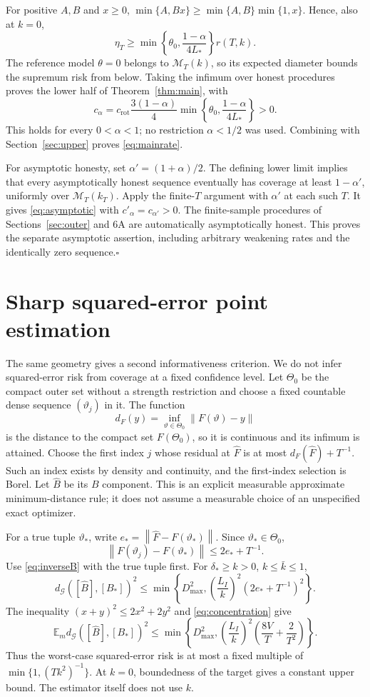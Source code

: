 \documentclass[11pt,a4paper]{article}
\numberwithin{equation}{section}
\newcommand{\E}{\mathbb E}
\newcommand{\cM}{\mathcal M}
\newcommand{\cG}{\mathcal G}
\newcommand{\norm}[1]{\left\lVert #1\right\rVert}
\begin{document}
For positive \(A,B\) and \(x\ge0\),
\(\min\{A,Bx\}\ge\min\{A,B\}\min\{1,x\}\). Hence, also at \(k=0\),
\[
 \eta_T\ge
 \min\left\{\theta_0,\frac{1-\alpha}{4L_*}\right\}r(T,k).
\]
The reference model \(\theta=0\) belongs to \(\cM_T(k)\), so its
expected diameter bounds the supremum risk from below.
Taking the infimum over honest procedures proves the lower half of
Theorem~\ref{thm:main}, with
\[
 c_\alpha=c_{\mathrm{rot}}\frac{3(1-\alpha)}4
       \min\left\{\theta_0,\frac{1-\alpha}{4L_*}\right\}>0.
\]
This holds for every \(0<\alpha<1\); no restriction
\(\alpha<1/2\) was used. Combining with Section~\ref{sec:upper}
proves \eqref{eq:mainrate}.

For asymptotic honesty, set \(\alpha'=(1+\alpha)/2\).
The defining lower limit implies that every asymptotically honest
sequence eventually has coverage at least \(1-\alpha'\), uniformly
over \(\cM_T(k_T)\). Apply the finite-\(T\) argument with \(\alpha'\)
at each such \(T\). It gives \eqref{eq:asymptotic} with
\(c'_\alpha=c_{\alpha'}>0\).
The finite-sample procedures of Sections~\ref{sec:outer} and 6A are
automatically asymptotically honest. This proves the separate asymptotic
assertion, including arbitrary weakening
rates and the identically zero sequence.\hfill\(\square\)

\section{Sharp squared-error point estimation}\label{sec:estimation}
The same geometry gives a second informativeness criterion.
We do not infer squared-error risk from coverage at a fixed confidence
level. Let \(\Theta_0\) be the compact outer set without a strength
restriction and choose a fixed countable dense sequence
\((\vartheta_j)\) in it.
The function
\[
 d_F(y)=\inf_{\vartheta\in\Theta_0}\norm{F(\vartheta)-y}
\]
is the distance to the compact set \(F(\Theta_0)\), so it is continuous
and its infimum is attained.
Choose the first index \(j\) whose residual at \(\widehat F\) is at most
\(d_F(\widehat F)+T^{-1}\).
Such an index exists by density and continuity, and the first-index
selection is Borel.
Let \(\widehat B\) be its \(B\) component.
This is an explicit measurable approximate minimum-distance rule; it does
not assume a measurable choice of an unspecified exact optimizer.

For a true tuple \(\vartheta_*\), write
\(e_*=\norm{\widehat F-F(\vartheta_*)}\).
Since \(\vartheta_*\in\Theta_0\),
\[
 \norm{F(\vartheta_j)-F(\vartheta_*)}\le2e_*+T^{-1}.
\]
Use \eqref{eq:inverseB} with the true tuple first.
For \(\delta_*\ge k>0\), \(k\le\bar k\le1\),
\[
 d_{\cG}([\widehat B],[B_*])^2
 \le\min\left\{D_{\max}^2,
       \left(\frac{L_I}{k}\right)^2(2e_*+T^{-1})^2\right\}.
\]
The inequality \((x+y)^2\le2x^2+2y^2\) and
\eqref{eq:concentration} give
\[
 \E_m d_{\cG}([\widehat B],[B_*])^2
 \le\min\left\{D_{\max}^2,
       \left(\frac{L_I}{k}\right)^2
           \left(\frac{8V}{T}+\frac2{T^2}\right)\right\}.
\]
Thus the worst-case squared-error risk is at most a fixed multiple of
\(\min\{1,(Tk^2)^{-1}\}\).
At \(k=0\), boundedness of the target gives a constant upper bound.
The estimator itself does not use \(k\).
\end{document}
